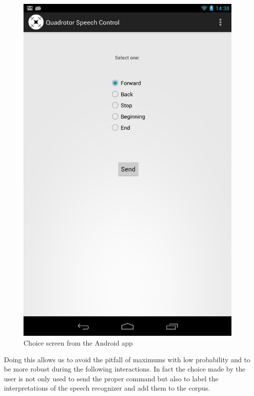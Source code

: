 \begin{figure}[h!]
  \centering
    \includegraphics[scale=0.25]{figs/tablet2.png}
  \caption{Choice screen from the Android app}
  \label{fig:tablet_choice}
\end{figure}

\noindent Doing this allows us to avoid the pitfall of maximums with low probability and to be more robust during the following interactions. In fact the choice made by the user is not only used to send the proper command but also to label the interpretations of the speech recognizer and add them to the corpus.